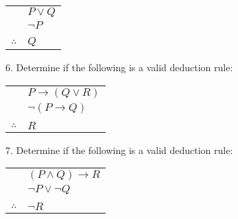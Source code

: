 \documentclass[10pt,]{book}
\theoremstyle{plain}
\theoremstyle{definition}
\theoremstyle{definition}
\theoremstyle{definition}
\numberwithin{equation}{chapter}
\newcommand{\hrulethin}  {\noalign{\hrule height 0.04em}}
\def\imp{\rightarrow}
\begin{document}
\begin{exerciselist}
\begin{tabular}{ll}
&\(P \vee Q\)\tabularnewline[0pt]
&\(\neg P\)\tabularnewline[0pt]
&\tabularnewline\hrulethin
\(\therefore\)&\(Q\)
\end{tabular}
\par\smallskip
\item[6.]\hypertarget{exercise-225}{}
              Determine if the following is a valid deduction rule:
\begin{tabular}{ll}
&\(P \imp (Q \vee R)\)\tabularnewline[0pt]
&\(\neg(P \imp Q)\)\tabularnewline[0pt]
&\tabularnewline\hrulethin
\(\therefore\)&\(R\)
\end{tabular}
\par\smallskip
\item[7.]\hypertarget{exercise-226}{}
              Determine if the following is a valid deduction rule:
\begin{tabular}{ll}
&\((P \wedge Q) \imp R\)\tabularnewline[0pt]
&\(\neg P \vee \neg Q\)\tabularnewline[0pt]
&\tabularnewline\hrulethin
\(\therefore\)&\(\neg R\)
\end{tabular}
\par\smallskip
\end{exerciselist}
\typeout{************************************************}
\typeout{************************************************}
\end{document}
